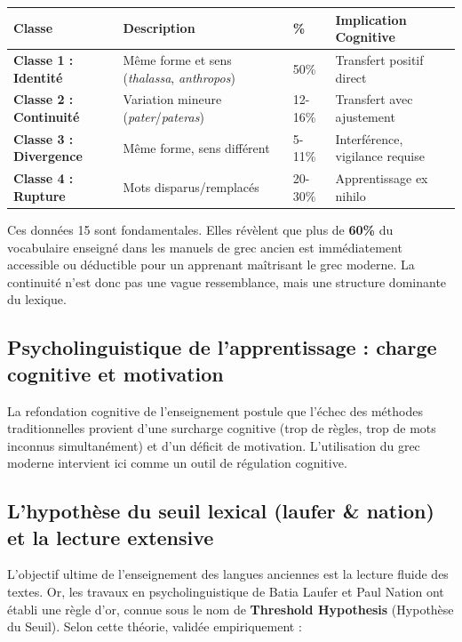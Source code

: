 \begin{table}[h!]\small\centering\begin{tabular}{| p{2.2cm} | p{2.8cm} | p{1.8cm} | p{3.2cm} |}\hline\textbf{Classe} & \textbf{Description} & \textbf{\%} & \textbf{Implication Cognitive} \\ \hline\textbf{Classe 1 : Identité} & Même forme et sens (\textit{thalassa}, \textit{anthropos}) & 50\% & Transfert positif direct \\ \hline\textbf{Classe 2 : Continuité} & Variation mineure (\textit{pater}/\textit{pateras}) & 12-16\% & Transfert avec ajustement \\ \hline\textbf{Classe 3 : Divergence} & Même forme, sens différent & 5-11\% & Interférence, vigilance requise \\ \hline\textbf{Classe 4 : Rupture} & Mots disparus/remplacés & 20-30\% & Apprentissage ex nihilo \\ \hline\end{tabular}\end{table}Ces données 15 sont fondamentales. Elles révèlent que plus de \textbf{60\%} du vocabulaire enseigné
dans les manuels de grec ancien est immédiatement accessible ou déductible pour un apprenant
maîtrisant le grec moderne. La continuité n'est donc pas une vague ressemblance, mais une structure
dominante du lexique.



\subsection{Psycholinguistique de l'apprentissage : charge cognitive et motivation}

La refondation cognitive de l'enseignement postule que l'échec des méthodes traditionnelles provient
d'une surcharge cognitive (trop de règles, trop de mots inconnus simultanément) et d'un déficit de
motivation. L'utilisation du grec moderne intervient ici comme un outil de régulation cognitive.



\subsection{L'hypothèse du seuil lexical (laufer \& nation) et la lecture extensive}

L'objectif ultime de l'enseignement des langues anciennes est la lecture fluide des textes. Or, les
travaux en psycholinguistique de Batia Laufer et Paul Nation ont établi une règle d'or, connue sous
le nom de \textbf{\og Threshold Hypothesis\fg{}} (Hypothèse du Seuil).\cite{ref16} Selon cette
théorie, validée empiriquement :

